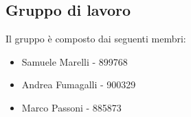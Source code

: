 \documentclass{article}
\begin{document}
    \subsection{Gruppo di lavoro}
    Il gruppo è composto dai seguenti membri:
    \begin{itemize}
        \item Samuele Marelli - 899768
        \item Andrea Fumagalli - 900329
        \item Marco Passoni - 885873
    \end{itemize}

\newpage





\end{document}

